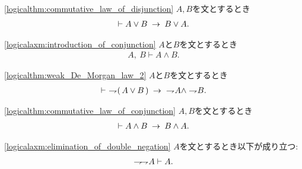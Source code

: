 	\begin{screen}
		\begin{logicalthm}[論理和の可換律]
		\ref{logicalthm:commutative_law_of_disjunction}
			$A,B$を文とするとき
			\begin{align}
				\vdash A \vee B \hspace{0.25em}\rightarrow\hspace{0.25em} B \vee A.
			\end{align}
		\end{logicalthm}
	\end{screen}
	
	\begin{screen}
		\begin{logicalaxm}[論理積の導入]
		\ref{logicalaxm:introduction_of_conjunction}
			$A$と$B$を文とするとき
			\begin{align}
				A,\ B \vdash A \wedge B.
			\end{align}
		\end{logicalaxm}
	\end{screen}
	
	\begin{screen}
		\begin{logicalthm}
		\ref{logicalthm:weak_De_Morgan_law_2}
			$A$と$B$を文とするとき
			\begin{align}
				\vdash\ \rightharpoondown\hspace{-0.25em} (\, A \vee B\, ) 
				\hspace{0.25em}\rightarrow\hspace{0.25em}\ \rightharpoondown\hspace{-0.25em} A \wedge \rightharpoondown\hspace{-0.25em} B.
			\end{align}
		\end{logicalthm}
	\end{screen}
	
	\begin{screen}
		\begin{logicalthm}[論理積の可換律]
		\ref{logicalthm:commutative_law_of_conjunction}
			$A,B$を文とするとき
			\begin{align}
				\vdash A \wedge B \hspace{0.25em}\rightarrow\hspace{0.25em} B \wedge A.
			\end{align}
		\end{logicalthm}
	\end{screen}
	
	\begin{screen}
		\begin{logicalaxm}[二重否定の除去]
		\ref{logicalaxm:elimination_of_double_negation}
			$A$を文とするとき以下が成り立つ:
			\begin{align}
				\rightharpoondown\hspace{-0.25em} \rightharpoondown\hspace{-0.25em} A \vdash A.
			\end{align}
		\end{logicalaxm}
	\end{screen}
	
